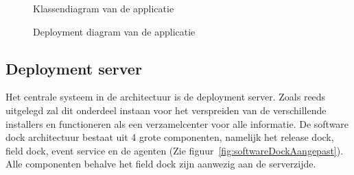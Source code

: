 \begin{figure}[!ht]
\centering
{}
\caption{Klassendiagram van de applicatie}
\label{fig:classDiagram}
\caption{Deployment diagram van de applicatie}
\label{fig:deploymentDiagram}
\end{figure}
\clearpage

\subsection{Deployment server}
Het centrale systeem in de architectuur is de deployment server.
Zoals reeds uitgelegd zal dit onderdeel instaan voor het verspreiden van de verschillende installers en functioneren als een verzamelcenter voor alle informatie.
De software dock architectuur bestaat uit 4 grote componenten, namelijk het release dock, field dock, event service en de agenten (Zie figuur~\ref{fig:softwareDockAangepast}).
Alle componenten behalve het field dock zijn aanwezig aan de serverzijde.

